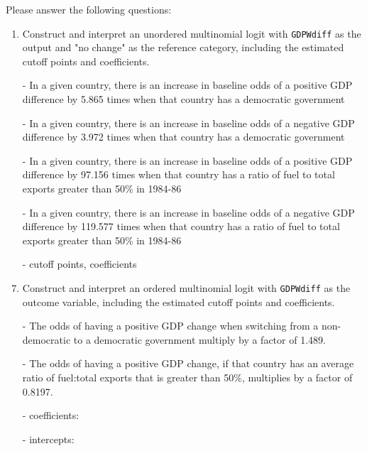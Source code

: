 \documentclass[12pt,letterpaper]{article}
\begin{document}
\noindent Please answer the following questions:

\begin{enumerate}
	\item Construct and interpret an unordered multinomial logit with \texttt{GDPWdiff} as the output and "no change" as the reference category, including the estimated cutoff points and coefficients.
	\item[-] In a given country, there is an increase in baseline odds of a positive GDP difference by 5.865 times when that country has a democratic government
	\item[-] In a given country, there is an increase in baseline odds of a negative GDP difference by 3.972 times when that country has a democratic government
	\item[-] In a given country, there is an increase in baseline odds of a positive GDP difference by 97.156 times when that country has a ratio of fuel to total exports greater than 50\% in 1984-86
	\item[-] In a given country, there is an increase in baseline odds of a negative GDP difference by 119.577 times when that country has a ratio of fuel to total exports greater than 50\% in 1984-86
	\item [-] cutoff points, coefficients
	
	
	\item Construct and interpret an ordered multinomial logit with \texttt{GDPWdiff} as the outcome variable, including the estimated cutoff points and coefficients.
	\item[-] The odds of having a positive GDP change when switching from a non-democratic to a democratic government multiply by a factor of 1.489. 
	\item[-] The odds of having a positive GDP change, if that country has an average ratio of fuel:total exports that is greater than 50\%, multiplies by a factor of 0.8197.
	\item[-] coefficients:
	
	\item[-] intercepts:
	
	
	
	
\end{enumerate}
\end{document}
